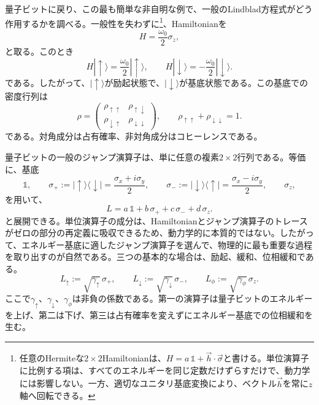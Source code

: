 \documentclass[a4paper,11pt,oneside]{article}
\theoremstyle{definition}
\numberwithin{equation}{section}
\begin{document}
量子ビットに戻り、この最も簡単な非自明な例で、一般のLindblad方程式がどう作用するかを調べる。一般性を失わずに\footnote{任意のHermiteな$2\times 2$Hamiltonianは、$H=a\,\mathds{1} +\vec h\cdot\vec \sigma$と書ける。単位演算子に比例する項は、すべてのエネルギーを同じ定数だけずらすだけで、動力学には影響しない。一方、適切なユニタリ基底変換により、ベクトル$\vec h$を常に$z$軸へ回転できる。}、Hamiltonianを
\begin{equation}
H = \frac{\omega_0}{2}\sigma_z ,
\end{equation}
と取る。このとき
\begin{equation}
H|\uparrow\rangle = \frac{\omega_0}{2}|\uparrow\rangle ,
\qquad
H|\downarrow\rangle = -\frac{\omega_0}{2}|\downarrow\rangle .
\end{equation}
である。したがって、$|\uparrow\rangle$が励起状態で、$|\downarrow\rangle$が基底状態である。この基底での密度行列は
\begin{equation}
\rho =
\begin{pmatrix}
\rho_{\uparrow\uparrow} & \rho_{\uparrow\downarrow} \\
\rho_{\downarrow\uparrow} & \rho_{\downarrow\downarrow}
\end{pmatrix},
\qquad
\rho_{\uparrow\uparrow}+\rho_{\downarrow\downarrow}=1 .
\end{equation}
である。対角成分は占有確率、非対角成分はコヒーレンスである。



量子ビットの一般のジャンプ演算子は、単に任意の複素$2\times 2$行列である。等価に、基底
\begin{equation}
\mathds{1} ,\qquad
\sigma_+ := |\uparrow\rangle\langle\downarrow| = \frac{\sigma_x+i\sigma_y}{2},
\qquad
\sigma_- := |\downarrow\rangle\langle\uparrow| = \frac{\sigma_x-i\sigma_y}{2},
\qquad
\sigma_z ,
\end{equation}
を用いて、
\begin{equation}
L = a\,\mathds{1}  + b\,\sigma_+ + c\,\sigma_- + d\,\sigma_z .
\end{equation}
と展開できる。単位演算子の成分は、Hamiltonianとジャンプ演算子のトレースがゼロの部分の再定義に吸収できるため、動力学的に本質的ではない。したがって、エネルギー基底に適したジャンプ演算子を選んで、物理的に最も重要な過程を取り出すのが自然である。三つの基本的な場合は、励起、緩和、位相緩和である。
\begin{equation}
L_\uparrow := \sqrt{\gamma_\uparrow}\,\sigma_+,
\qquad
L_\downarrow := \sqrt{\gamma_\downarrow}\,\sigma_-,
\qquad
L_\phi := \sqrt{\gamma_\phi}\,\sigma_z .
\end{equation}
ここで$\gamma_\uparrow$、$\gamma_\downarrow$、$\gamma_\phi$は非負の係数である。第一の演算子は量子ビットのエネルギーを上げ、第二は下げ、第三は占有確率を変えずにエネルギー基底での位相緩和を生む。
\end{document}

